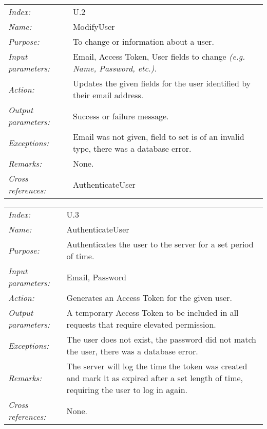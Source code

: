 \documentclass[10pt,letter]{article}
\begin{document}
\begin{tabularx}{\textwidth}{l X}
    \it{Index:} & U.2 \\
    \it{Name:} & ModifyUser \\
    \it{Purpose:} & To change or information about a user. \\
    \it{Input parameters:} & Email, Access Token, User fields to change \it{(e.g. Name, Password, etc.).} \\
    \it{Action:} & Updates the given fields for the user identified by their email address. \\
    \it{Output parameters:} & Success or failure message. \\
    \it{Exceptions:} & Email was not given, field to set is of an invalid type, there was a database error. \\
    \it{Remarks:} & None. \\
    \it{Cross references:} & AuthenticateUser \\
    \hline
\end{tabularx}

\begin{tabularx}{\textwidth}{l X}
    \it{Index:} & U.3 \\
    \it{Name:} & AuthenticateUser \\
    \it{Purpose:} & Authenticates the user to the server for a set period of time. \\
    \it{Input parameters:} & Email, Password \\
    \it{Action:} & Generates an Access Token for the given user. \\
    \it{Output parameters:} & A temporary Access Token to be included in all requests that require elevated permission. \\
    \it{Exceptions:} & The user does not exist, the password did not match the user, there was a database error. \\
    \it{Remarks:} & The server will log the time the token was created and mark it as expired after a set length of time, 
    requiring the user to log in again. \\
    \it{Cross references:} & None. \\
    \hline
\end{tabularx}
\end{document}
